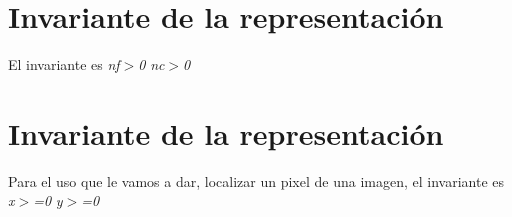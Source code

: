 \hypertarget{repConjunto_invConjunto}{}\section{Invariante de la representación}\label{repConjunto_invConjunto}
El invariante es {\itshape nf$>$0} {\itshape nc$>$0} \hypertarget{repConjunto_invConjunto}{}\section{Invariante de la representación}\label{repConjunto_invConjunto}
Para el uso que le vamos a dar, localizar un pixel de una imagen, el invariante es {\itshape x$>$=0} {\itshape y$>$=0} 